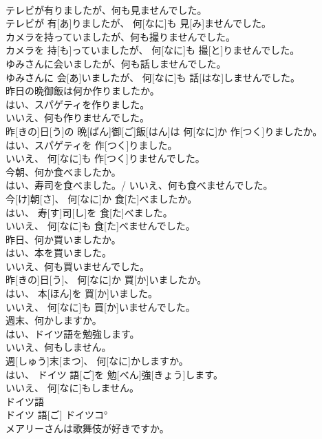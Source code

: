 \documentclass[8pt]{extreport}
\begin{document}
\begin{CJK}{UTF8}{min}
\\	テレビが有りましたが、何も見ませんでした。	
\\	テレビが 有[あ]りましたが、 何[なに]も 見[み]ませんでした。
\\	カメラを持っていましたが、何も撮りませんでした。	
\\	カメラを 持[も]っていましたが、 何[なに]も 撮[と]りませんでした。
\\	ゆみさんに会いましたが、何も話しませんでした。	
\\	ゆみさんに 会[あ]いましたが、 何[なに]も 話[はな]しませんでした。
\\	昨日の晩御飯は何か作りましたか。 
\\	はい、スパゲティを作りました。 
\\	いいえ、何も作りませんでした。	
\\	昨[きの]日[う]の 晩[ばん]御[ご]飯[はん]は 何[なに]か 作[つく]りましたか。 
\\	はい、スパゲティを 作[つく]りました。 
\\	いいえ、 何[なに]も 作[つく]りませんでした。
\\	今朝、何か食べましたか。 
\\	はい、寿司を食べました。/ いいえ、何も食べませんでした。	
\\	今[け]朝[さ]、 何[なに]か 食[た]べましたか。 
\\	はい、 寿[す]司[し]を 食[た]べました。 
\\	いいえ、 何[なに]も 食[た]べませんでした。
\\	昨日、何か買いましたか。 
\\	はい、本を買いました。 
\\	いいえ、何も買いませんでした。	
\\	昨[きの]日[う]、 何[なに]か 買[か]いましたか。 
\\	はい、 本[ほん]を 買[か]いました。 
\\	いいえ、 何[なに]も 買[か]いませんでした。
\\	週末、何かしますか。 
\\	はい、ドイツ語を勉強します。 
\\	いいえ、何もしません。	
\\	週[しゅう]末[まつ]、 何[なに]かしますか。 
\\	はい、 ドイツ 語[ご]を 勉[べん]強[きょう]します。 
\\	いいえ、 何[なに]もしません。
\\	ドイツ語	
\\	ドイツ 語[ご]	ドイツコ°
\\	メアリーさんは歌舞伎が好きですか。	

\end{CJK}
\end{document}
